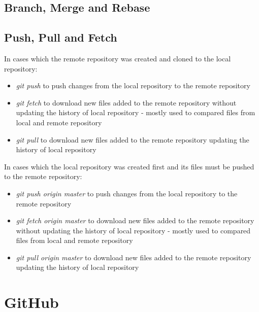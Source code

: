 \documentclass{article}
\begin{document}
\subsection{Branch, Merge and Rebase}


\subsection{Push, Pull and Fetch}

In cases which the remote repository was created and cloned to the local repository:

\begin{itemize}
    \item \textit{git push} to push changes from the local repository to the remote repository
    \item \textit{git fetch} to download new files added to the remote repository without updating the history of local repository - mostly used to compared files from local and remote repository
    \item \textit{git pull} to download new files added to the remote repository updating the history of local repository
\end{itemize}


In cases which the local repository was created first and its files must be pushed to the remote repository:


\begin{itemize}
	\item \textit{git push origin master} to push changes from the local repository to the remote repository
	\item \textit{git fetch origin master} to download new files added to the remote repository without updating the history of local repository - mostly used to compared files from local and remote repository
	\item \textit{git pull origin master} to download new files added to the remote repository updating the history of local repository
\end{itemize}


\section{GitHub}
\end{document}
